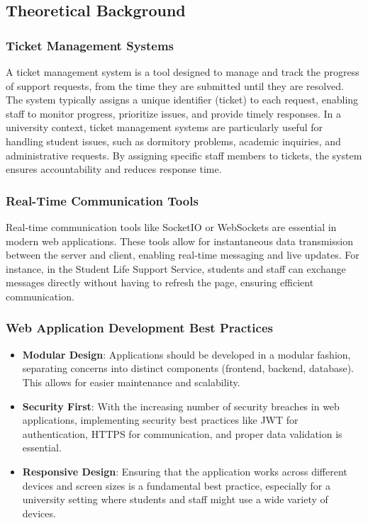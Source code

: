 \subsection{Theoretical Background}

	\subsubsection{Ticket Management Systems}
	A ticket management system is a tool designed to manage and track the progress of support requests, from the time they are submitted until they are resolved. The system typically assigns a unique identifier (ticket) to each request, enabling staff to monitor progress, prioritize issues, and provide timely responses.
	In a university context, ticket management systems are particularly useful for handling student issues, such as dormitory problems, academic inquiries, and administrative requests. By assigning specific staff members to tickets, the system ensures accountability and reduces response time.
	
	\subsubsection{Real-Time Communication Tools}
	Real-time communication tools like SocketIO or WebSockets are essential in modern web applications. These tools allow for instantaneous data transmission between the server and client, enabling real-time messaging and live updates. For instance, in the Student Life Support Service, students and staff can exchange messages directly without having to refresh the page, ensuring efficient communication.
	
	\subsubsection{Web Application Development Best Practices}
	\begin{itemize}
		\item \textbf{Modular Design}: Applications should be developed in a modular fashion, separating concerns into distinct components (frontend, backend, database). This allows for easier maintenance and scalability.
		
		\item \textbf{Security First}: With the increasing number of security breaches in web applications, implementing security best practices like JWT for authentication, HTTPS for communication, and proper data validation is essential.
		
		\item \textbf{Responsive Design}: Ensuring that the application works across different devices and screen sizes is a fundamental best practice, especially for a university setting where students and staff might use a wide variety of devices.
	\end{itemize}
		
